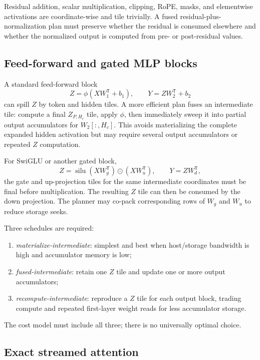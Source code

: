 Residual addition, scalar multiplication, clipping, RoPE, masks, and elementwise activations are coordinate-wise and tile trivially. A fused residual-plus-normalization plan must preserve whether the residual is consumed elsewhere and whether the normalized output is computed from pre- or post-residual values.

\subsection{Feed-forward and gated MLP blocks}

A standard feed-forward block
\[
  Z=\phi(XW_1^{\mathsf T}+b_1),\qquad
  Y=ZW_2^{\mathsf T}+b_2
\]
can spill $Z$ by token and hidden tiles. A more efficient plan fuses an intermediate tile: compute a final $Z_{P,H_c}$ tile, apply $\phi$, then immediately sweep it into partial output accumulators for $W_2[:,H_c]$. This avoids materializing the complete expanded hidden activation but may require several output accumulators or repeated $Z$ computation.

For SwiGLU or another gated block,
\[
  Z=\operatorname{silu}(XW_g^{\mathsf T})\odot(XW_u^{\mathsf T}),
  \qquad Y=ZW_d^{\mathsf T},
\]
the gate and up-projection tiles for the same intermediate coordinates must be final before multiplication. The resulting $Z$ tile can then be consumed by the down projection. The planner may co-pack corresponding rows of $W_g$ and $W_u$ to reduce storage seeks.

Three schedules are required:

\begin{enumerate}
  \item \emph{materialize-intermediate}: simplest and best when host/storage bandwidth is high and accumulator memory is low;
  \item \emph{fused-intermediate}: retain one $Z$ tile and update one or more output accumulators;
  \item \emph{recompute-intermediate}: reproduce a $Z$ tile for each output block, trading compute and repeated first-layer weight reads for less accumulator storage.
\end{enumerate}

The cost model must include all three; there is no universally optimal choice.

\subsection{Exact streamed attention}


